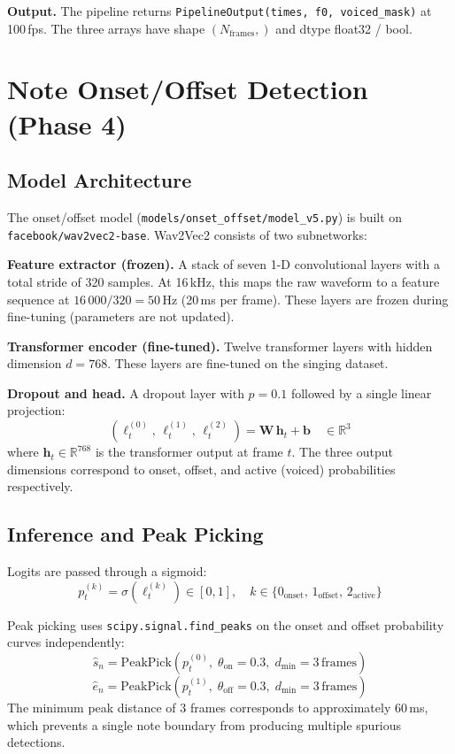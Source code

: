 \documentclass[11pt,letterpaper]{article}
\newcommand{\sh}{\hat{s}}
\newcommand{\eh}{\hat{e}}
\begin{document}
\textbf{Output.}
The pipeline returns \texttt{PipelineOutput(times, f0, voiced\_mask)} at
100\,fps.
The three arrays have shape $(N_\text{frames},)$ and dtype float32 / bool.

\section{Note Onset/Offset Detection (Phase 4)}

\subsection{Model Architecture}

The onset/offset model (\texttt{models/onset\_offset/model\_v5.py}) is built on
\texttt{facebook/wav2vec2-base}.
Wav2Vec2 consists of two subnetworks:

\textbf{Feature extractor (frozen).}
A stack of seven 1-D convolutional layers with a total stride of 320 samples.
At 16\,kHz, this maps the raw waveform to a feature sequence at
$16\,000/320 = 50$\,Hz (20\,ms per frame).
These layers are frozen during fine-tuning (parameters are not updated).

\textbf{Transformer encoder (fine-tuned).}
Twelve transformer layers with hidden dimension $d = 768$.
These layers are fine-tuned on the singing dataset.

\textbf{Dropout and head.}
A dropout layer with $p = 0.1$ followed by a single linear projection:
\[
  (\ell_t^{(0)},\,\ell_t^{(1)},\,\ell_t^{(2)}) = \mathbf{W}\,\mathbf{h}_t + \mathbf{b}
  \quad \in \mathbb{R}^3
\]
where $\mathbf{h}_t \in \mathbb{R}^{768}$ is the transformer output at frame
$t$.
The three output dimensions correspond to onset, offset, and active (voiced)
probabilities respectively.

\subsection{Inference and Peak Picking}

Logits are passed through a sigmoid:
\[
  p_t^{(k)} = \sigma\!\left(\ell_t^{(k)}\right) \in [0,1],
  \quad k \in \{0_\text{onset},\, 1_\text{offset},\, 2_\text{active}\}
\]

Peak picking uses \texttt{scipy.signal.find\_peaks} on the onset and offset
probability curves independently:
\[
  \sh_n = \mathrm{PeakPick}\!\left(p_t^{(0)},\;
    \theta_\text{on}{=}0.3,\; d_\text{min}{=}3\,\text{frames}\right)
\]
\[
  \eh_n = \mathrm{PeakPick}\!\left(p_t^{(1)},\;
    \theta_\text{off}{=}0.3,\; d_\text{min}{=}3\,\text{frames}\right)
\]
The minimum peak distance of 3 frames corresponds to approximately 60\,ms,
which prevents a single note boundary from producing multiple spurious
detections.
\end{document}

